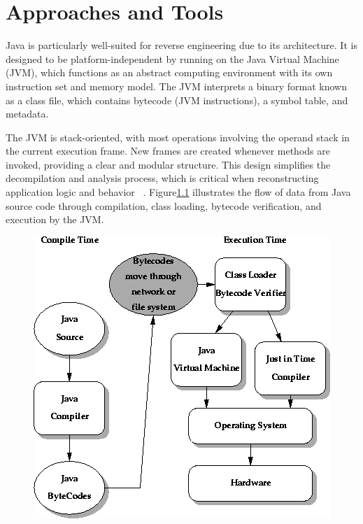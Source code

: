 \chapter{Approaches and Tools}
Java is particularly well-suited for reverse engineering due to its architecture. It is designed to be platform-independent by running on the Java Virtual Machine (JVM), which functions as an abstract computing environment with its own instruction set and memory model. The JVM interprets a binary format known as a class file, which contains bytecode (JVM instructions), a symbol table, and metadata.

The JVM is stack-oriented, with most operations involving the operand stack in the current execution frame. New frames are created whenever methods are invoked, providing a clear and modular structure. This design simplifies the decompilation and analysis process, which is critical when reconstructing application logic and behavior ~\cite{jvms8}.
Figure\ref{fig:javaprocess} illustrates the flow of data from Java source code through compilation, class loading, bytecode verification, and execution by the JVM.
\begin{figure}
	\centering
	\includegraphics[scale=.7]{java_process.png}
	\caption{}
	\label{fig:javaprocess}
\end{figure}

